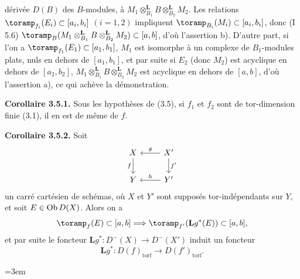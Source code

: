 dérivée \(D(B)\) des \(B\)-modules, à \(M_1\otimes_{B_1}^{\mathbf L}B\otimes_{B_2}^{\mathbf L}M_2\). Les relations \(\toramp_{f_i}(E_i)\subset[a_i,b_i]\) \((i=1,2)\) impliquent \(\toramp_{B_i}(M_i)\subset[a_i,b_i]\), donc (I 5.6) \(\toramp_B(M_1\otimes_{B_1}^{\mathbf L}B\otimes_{B_2}^{\mathbf L}M_2)\subset[a,b]\), d'où l'assertion b). D'autre part, si l'on a \(\toramp_{f_1}(E_1)\subset[a_1,b_1]\), \(M_1\) est isomorphe à un complexe de \(B_1\)-modules plats, nuls en dehors de \([a_1,b_1]\), et par suite si \(E_2\) (donc \(M_2\)) est acyclique en dehors de \([a_2,b_2]\), \(M_1\otimes_{B_1}^{\mathbf L}B\otimes_{B_2}^{\mathbf L}M_2\) est acyclique en dehors de \([a,b]\), d'où l'assertion a), ce qui achève la démonstration.

\textbf{Corollaire 3.5.1.} Sous les hypothèses de (3.5), si \(f_1\) et \(f_2\) sont de tor-dimension finie (3.1), il en est de même de \(f\).

\textbf{Corollaire 3.5.2.} Soit
\[
\begin{tikzcd}
X \arrow[d,"f"'] & X' \arrow[l,"g"'] \arrow[d,"f'"]\\
Y & Y' \arrow[l,"h"']
\end{tikzcd}
\]
un carré cartésien de schémas, où \(X\) et \(Y'\) sont supposés tor-indépendants sur \(Y\), et soit \(E\in\Ob D(X)\). Alors on a
\[
  \toramp_f(E)\subset[a,b]\Longrightarrow
  \toramp_{f'}(\mathbf Lg^*(E))\subset[a,b],
\]
et par suite le foncteur \(\mathbf Lg^*:D^{-}(X)\to D^{-}(X')\) induit un foncteur
\[
  \mathbf Lg^*:D(f)_{\mathrm{torf}}\longrightarrow D(f')_{\mathrm{torf}} .
\]



\renewcommand{\Ob}{\operatorname{Ob}}
\providecommand{\D}{\mathrm D}
\providecommand{\Ho}{\mathrm H}
\providecommand{\RHom}{\mathrm R\!\operatorname{Hom}}
\providecommand{\parfamp}{\operatorname{parf.amp}}
\providecommand{\tamp}{\operatorname{tor.amp}}
\providecommand{\Qcoh}{\operatorname{Qcoh}}
\providecommand{\Mod}{\operatorname{Mod}}
\providecommand{\Coh}{\operatorname{Coh}}
\providecommand{\Lib}{\operatorname{Lib}}
\providecommand{\Loclib}{\operatorname{Loclib}}
\providecommand{\qcoh}{\mathrm{qcoh}}
\providecommand{\coh}{\mathrm{coh}}
\providecommand{\parf}{\mathrm{parf}}
\providecommand{\torf}{\mathrm{torf}}
\renewcommand{\id}{\operatorname{id}}
\providecommand{\uparf}{\underline{\mathrm{parf}}\rule[-1ex]{0pt}{0pt}}
\providecommand{\Coker}{\operatorname{Coker}}
\providecommand{\rank}{\operatorname{rank}}
\providecommand{\rg}{\operatorname{rg}}
\providecommand{\Hom}{\operatorname{Hom}}
\providecommand{\Ext}{\operatorname{Ext}}
\providecommand{\Spec}{\operatorname{Spec}}
\providecommand{\Cone}{\operatorname{Cone}}
\providecommand{\pt}{\operatorname{Pt}}
\providecommand{\ind}{\operatorname{ind}}
\hfuzz=20pt
\emergencystretch=3em

